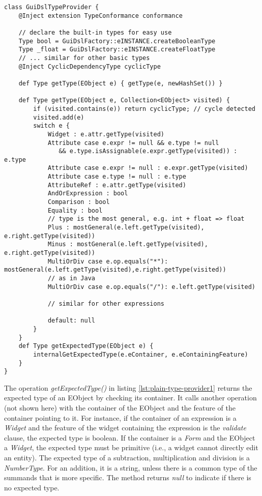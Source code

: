 \begin{lstlisting}[language=xtend,float=tb,label=lst:plain-type-provider1,caption=Type provider in Xtend.] 
class GuiDslTypeProvider {
	@Inject extension TypeConformance conformance
	
	// declare the built-in types for easy use
	Type bool = GuiDslFactory::eINSTANCE.createBooleanType
	Type _float = GuiDslFactory::eINSTANCE.createFloatType
	// ... similar for other basic types
	@Inject CyclicDependencyType cyclicType

	def Type getType(EObject e) { getType(e, newHashSet()) }
	
	def Type getType(EObject e, Collection<EObject> visited) {
		if (visited.contains(e)) return cyclicType; // cycle detected
		visited.add(e)
		switch e {
			Widget : e.attr.getType(visited)
			Attribute case e.expr != null && e.type != null 
			   && e.type.isAssignable(e.expr.getType(visited)) : e.type
			Attribute case e.expr != null : e.expr.getType(visited)
			Attribute case e.type != null : e.type
			AttributeRef : e.attr.getType(visited)
			AndOrExpression : bool 
			Comparison : bool
			Equality : bool
			// type is the most general, e.g. int + float => float
			Plus : mostGeneral(e.left.getType(visited), e.right.getType(visited))
			Minus : mostGeneral(e.left.getType(visited), e.right.getType(visited))
			MultiOrDiv case e.op.equals("*"): mostGeneral(e.left.getType(visited),e.right.getType(visited))
			// as in Java
			MultiOrDiv case e.op.equals("/"): e.left.getType(visited)
			
			// similar for other expressions

			default: null
		}
	} 
	def Type getExpectedType(EObject e) {
		internalGetExpectedType(e.eContainer, e.eContainingFeature) 
	} 
}
\end{lstlisting}

The operation \emph{getExpectedType()} in listing \ref{lst:plain-type-provider1}
returns the expected type of an EObject by checking its container. It calls
another operation (not shown here) with the container of the EObject and the
feature of the container pointing to it. For instance, if the container of an
expression is a \emph{Widget} and the feature of the widget containing the
expression is the \emph{validate} clause, the expected type is boolean. If the
container is a \emph{Form} and the EObject a \emph{Widget}, the expected type
must be primitive (i.e., a widget cannot directly edit an entity).
The expected type of a subtraction, multiplication and division is a
\emph{NumberType}. For an addition, it is a string, unless there is a common
type of the summands that is more specific. The method returns \emph{null} to
indicate if there is no expected type.

